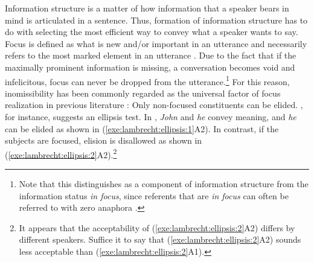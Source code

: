 \noindent Information structure is a matter of how information that a
speaker bears in mind is articulated in a sentence.
Thus, formation of information structure has to do with selecting the
most efficient way to convey what a speaker wants to say.  Focus is
defined as what is new and/or important in an utterance and
necessarily refers to the most marked element in an utterance
\citep{gundel:99,buring:10}.  Due to the fact that if the maximally
prominent information is missing, a conversation becomes void and
infelicitous, focus can never be dropped from the
utterance.\footnote{Note that this distinguishes  as a
  component of information structure from the information status
  \textit{in focus}, since referents that are \textit{in focus} can
  often be referred to with zero anaphora \citep{gundel:03}.}  For
this reason, inomissibility has been commonly regarded as the
universal factor of focus realization in previous literature
\citep{lambrecht:96,rebuschi:tuller:99}: Only non-focused constituents
can be elided.  \citeauthor{lambrecht:96}, for instance, suggests an
ellipsis test. In , \textit{John} and
\textit{he} convey  meaning, and \textit{he} can be elided
as shown in (\ref{exe:lambrecht:ellipsis:1}A2). In contrast, if the
subjects are focused, elision is disallowed as shown in
(\ref{exe:lambrecht:ellipsis:2}A2).\footnote{It appears that the
  acceptability of (\ref{exe:lambrecht:ellipsis:2}A2) differs by
  different speakers. Suffice it to say that
  (\ref{exe:lambrecht:ellipsis:2}A2) sounds less acceptable than
  (\ref{exe:lambrecht:ellipsis:2}A1).}






